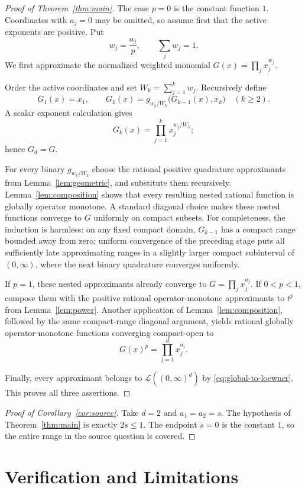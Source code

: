 \documentclass[11pt]{article}
\newcommand{\Loe}{\mathcal L}
\newcommand{\Pos}{(0,\infty)}
\begin{document}
\begin{proof}[Proof of Theorem~\ref{thm:main}]
The case $p=0$ is the constant function $1$.  Coordinates with $a_j=0$ may
be omitted, so assume first that the active exponents are positive.  Put
\[
                         w_j=\frac{a_j}{p},
                         \qquad \sum_j w_j=1.
\]
We first approximate the normalized weighted monomial
$G(x)=\prod_jx_j^{w_j}$.

Order the active coordinates and set $W_k=\sum_{j=1}^k w_j$.  Recursively
define
\[
 G_1(x)=x_1,
 \qquad
 G_k(x)=g_{w_k/W_k}\bigl(G_{k-1}(x),x_k\bigr)
 \quad (k\geq2).
\]
A scalar exponent calculation gives
\[
                         G_k(x)=\prod_{j=1}^k x_j^{w_j/W_k};
\]
hence $G_d=G$.

For every binary $g_{w_k/W_k}$ choose the rational positive quadrature
approximants from Lemma~\ref{lem:geometric}, and substitute them recursively.
Lemma~\ref{lem:composition} shows that every resulting nested rational
function is globally operator monotone.  A standard diagonal choice makes
these nested functions converge to $G$ uniformly on compact subsets.  For
completeness, the induction is harmless: on any fixed compact domain,
$G_{k-1}$ has a compact range bounded away from zero; uniform convergence of
the preceding stage puts all sufficiently late approximating ranges in a
slightly larger compact subinterval of $\Pos$, where the next binary
quadrature converges uniformly.

If $p=1$, these nested approximants already converge to
$G=\prod_jx_j^{a_j}$.  If $0<p<1$, compose them with the positive rational
operator-monotone approximants to $t^p$ from Lemma~\ref{lem:power}.  Another
application of Lemma~\ref{lem:composition}, followed by the same compact-range
diagonal argument, yields rational globally operator-monotone functions
converging compact-open to
\[
                         G(x)^p=\prod_{j=1}^d x_j^{a_j}.
\]

Finally, every approximant belongs to $\Loe(\Pos^d)$ by
\eqref{eq:global-to-loewner}.  This proves all three assertions.
\end{proof}

\begin{proof}[Proof of Corollary~\ref{cor:source}]
Take $d=2$ and $a_1=a_2=s$.  The hypothesis of
Theorem~\ref{thm:main} is exactly $2s\leq1$.  The endpoint $s=0$ is the
constant $1$, so the entire range in the source question is covered.
\end{proof}

\section*{Verification and Limitations}
\end{document}
